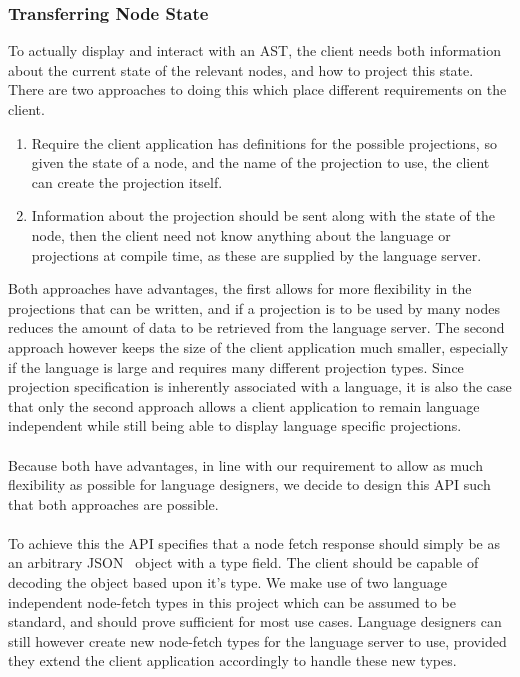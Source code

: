 \documentclass{article}
\begin{document}
\subsubsection{Transferring Node State}\label{apiNodeStateTransfer}
To actually display and interact with an AST, the client needs both information about the current state of the relevant nodes, and how to project this state. There are two approaches to doing this which place different requirements on the client.
\begin{enumerate}
\item Require the client application has definitions for the possible projections, so given the state of a node, and the name of the projection to use, the client can create the projection itself.
\item Information about the projection should be sent along with the state of the node, then the client need not know anything about the language or projections at compile time, as these are supplied by the language server.
\end{enumerate}
Both approaches have advantages, the first allows for more flexibility in the projections that can be written, and if a projection is to be used by many nodes reduces the amount of data to be retrieved from the language server. The second approach however keeps the size of the client application much smaller, especially if the language is large and requires many different projection types. Since projection specification is inherently associated with a language, it is also the case that only the second approach allows a client application to remain language independent while still being able to display language specific projections.
\\
\\
Because both have advantages, in line with our \RCustom requirement to allow as much flexibility as possible for language designers, we decide to design this API such that both approaches are possible.
\\
\\
To achieve this the API specifies that a node fetch response should simply be as an arbitrary JSON~\cite{json} object with a type field. The client should be capable of decoding the object based upon it's type. We make use of two language independent node-fetch types in this project which can be assumed to be standard, and should prove sufficient for most use cases. Language designers can still however create new node-fetch types for the language server to use, provided they extend the client application accordingly to handle these new types. 
\end{document}
